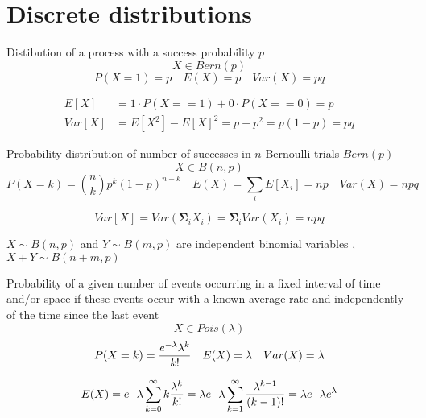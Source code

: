 \section{Discrete distributions}
\begin{slide} 
\begin{shaded}
    {\hfill Distibution of a process with a  success probability $p$\hfill}
    $$X \in Bern(p)$$
    $$
    P(X=1) = p 
    \quad 
    E(X)= p
    \quad
    Var(X)=pq
    $$
\end{shaded}
    
    \begin{align*}
        E[X] &= 1\cdot P(X==1) + 0\cdot P(X==0) =p \\
        Var[X] &= E[X^2]-E[X]^2 = p-p^2 =p(1-p) = pq
    \end{align*}
\end{slide}

\begin{slide} 
  \begin{shaded}
 {\hfill\noindent Probability distribution of number of successes in $n$ Bernoulli trials $Bern(p)$
 \hfill}
    $$X \in B(n,p)$$
    $$
    P(X=k) = {n \choose k} p^k(1-p)^{n-k} 
    \quad 
    E(X)=  \sum_iE[X_i] = np
    \quad
    Var(X)=npq
    $$
\end{shaded}
 $$   Var[X] = Var\left(\mathbf{\Sigma}_i X_i\right) = \mathbf{\Sigma}_i Var(X_i) = npq$$

\noindent{}
$X \sim B(n, p)$ and $Y \sim B(m, p)$ are independent binomial variables , $X+Y \sim B(n+m, p)$
\end{slide}

\begin{slide} 
  \begin{shaded}
{\noindent
Probability of a given number of events occurring in a fixed interval of time and/or space if these events occur with a known average rate and independently of the time since the last event
}
    $$X \in Pois(\lambda)$$
    $$
    P(X=k) = {e^{-\lambda} \lambda^k \over k!} 
    \quad 
    E(X)= \lambda
    \quad
    Var(X)= \lambda
    $$
  \end{shaded}
$$E(X) = e^-\lambda\sum_{k=0}^{\infty}k {\lambda^k \over k!}
 =\lambda e^-\lambda\sum_{k=1}^{\infty}{\lambda^{k-1} \over (k-1)!}
 = \lambda e^-\lambda e^\lambda
$$
\end{slide}

